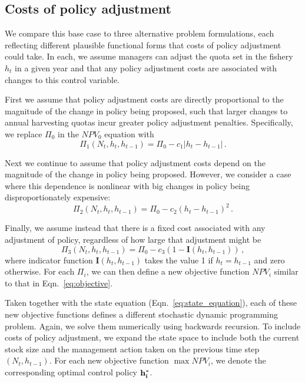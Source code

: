 \documentclass[12pt]{article}
\begin{document}
\subsection*{Costs of policy adjustment}
We compare this base case to three alternative problem formulations, each reflecting different plausible functional forms that costs of policy adjustment could take. In each, we assume managers can adjust the quota set in the fishery $h_t$ in a given year and that any policy adjustment costs are associated with changes to this control variable. 

First we assume that policy adjustment costs are directly proportional to the magnitude of the change in policy being proposed, such that larger changes to annual harvesting quotas incur greater policy adjustment penalties. Specifically, we replace $\Pi_0$ in the $NPV_0$ equation with 
\begin{equation}
  \Pi_{1}(N_t,h_t, h_{t-1}) = \Pi_0 - c_1  |  h_t - h_{t-1} | \,.
\end{equation}

Next we continue to assume that policy adjustment costs depend on the magnitude of the change in policy being proposed. However, we consider a case where this dependence is nonlinear with big changes in policy being disproportionately expensive:
\begin{equation}
  \Pi_{2}(N_t,h_t, h_{t-1}) = \Pi_0 - c_2 (  h_t - h_{t-1})^2 \,.
\end{equation}

Finally, we assume instead that there is a fixed cost associated with any adjustment of policy, regardless of how large that adjustment might be
\begin{equation}
  \Pi_{3}(N_t,h_t, h_{t-1}) = \Pi_0 - c_3 (1-\mathbf{I}(h_t, h_{t-1}))  \,,
\end{equation}
where indicator function $\mathbf{I}(h_t, h_{t-1})$ takes the value 1 if $h_t=h_{t-1}$ and zero otherwise. For each $\Pi_i$, we can then define a new objective function $NPV_i$ similar to that in Eqn.~\ref{eq:objective}. 

Taken together with the state equation (Eqn.~\ref{eq:state_equation}), each of these new objective functions defines a different stochastic dynamic programming problem. Again, we solve them numerically using backwards recursion.  To include costs of policy adjustment, we expand the state space to include both the current stock size and the management action taken on the previous time step $(N_t,h_{t-1})$. For each new objective function $\max NPV_i$, we denote the corresponding optimal control policy $ {\bf h_i^*} $.
\end{document}
